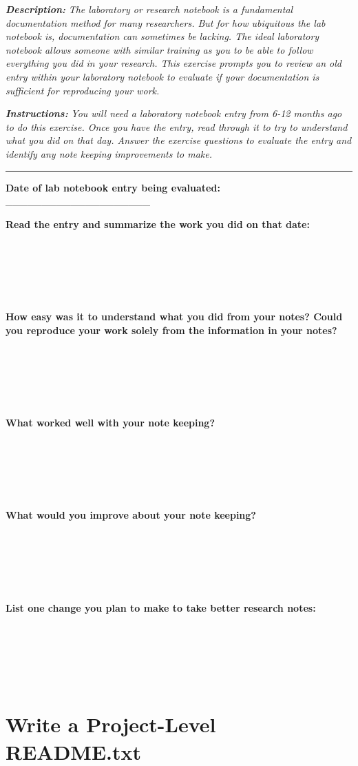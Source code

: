 \documentclass[
]{book}
\begin{document}
\textbf{\emph{Description:}} \emph{The laboratory or research notebook is a fundamental documentation method for many researchers. But for how ubiquitous the lab notebook is, documentation can sometimes be lacking. The ideal laboratory notebook allows someone with similar training as you to be able to follow everything you did in your research. This exercise prompts you to review an old entry within your laboratory notebook to evaluate if your documentation is sufficient for reproducing your work.}

\textbf{\emph{Instructions:}} \emph{You will need a laboratory notebook entry from 6-12 months ago to do this exercise. Once you have the entry, read through it to try to understand what you did on that day. Answer the exercise questions to evaluate the entry and identify any note keeping improvements to make.}

\begin{center}\rule{0.5\linewidth}{0.5pt}\end{center}

\textbf{Date of lab notebook entry being evaluated:} \_\_\_\_\_\_\_\_\_\_\_\_\_\_\_\_\_\_\_\_

\textbf{Read the entry and summarize the work you did on that date:}

~

~

~

\textbf{How easy was it to understand what you did from your notes? Could you reproduce your work solely from the information in your notes?}

~

~

~

\textbf{What worked well with your note keeping?}

~

~

~

\textbf{What would you improve about your note keeping?}

~

~

~

\textbf{List one change you plan to make to take better research notes:}

~

~

~

\hypertarget{readme-txt}{%
\section{Write a Project-Level README.txt}\label{readme-txt}}
\end{document}
